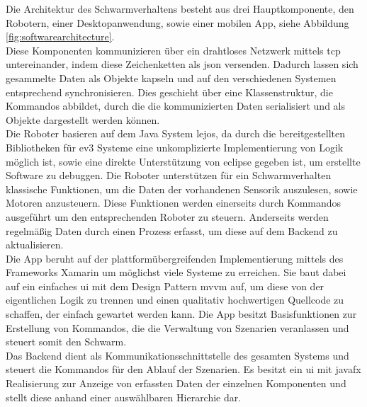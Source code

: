Die Architektur des Schwarmverhaltens besteht aus drei Hauptkomponente, den Robotern, einer Desktopanwendung, sowie einer mobilen App, siehe Abbildung \ref{fig:softwarearchitecture}.\\
Diese Komponenten kommunizieren über ein drahtloses Netzwerk mittels \gls{tcp} untereinander, indem diese Zeichenketten als \gls{json} versenden. Dadurch lassen sich gesammelte Daten als Objekte kapseln und auf den verschiedenen Systemen entsprechend synchronisieren. Dies geschieht über eine Klassenstruktur, die Kommandos abbildet, durch die die kommunizierten Daten serialisiert und als Objekte dargestellt werden können.\\
Die Roboter basieren auf dem Java System \gls{lejos}, da durch die bereitgestellten Bibliotheken für \gls{ev3} Systeme eine unkomplizierte Implementierung von Logik möglich ist, sowie eine direkte Unterstützung von \gls{eclipse} gegeben ist, um erstellte Software zu debuggen. Die Roboter unterstützen für ein Schwarmverhalten klassische Funktionen, um die Daten der vorhandenen Sensorik auszulesen, sowie Motoren anzusteuern. Diese Funktionen werden einerseits durch Kommandos ausgeführt um den entsprechenden Roboter zu steuern. Anderseits werden regelmäßig Daten durch einen Prozess erfasst, um diese auf dem Backend zu aktualisieren.\\
Die App beruht auf der plattformübergreifenden Implementierung mittels des Frameworks Xamarin um möglichst viele Systeme zu erreichen. Sie baut dabei auf ein einfaches \gls{ui} mit dem Design Pattern \gls{mvvm} auf, um diese von der eigentlichen Logik zu trennen und einen qualitativ hochwertigen Quellcode zu schaffen, der einfach gewartet werden kann. Die App besitzt Basisfunktionen zur Erstellung von Kommandos, die die Verwaltung von Szenarien veranlassen und steuert somit den Schwarm.\\
Das Backend dient als Kommunikationsschnittstelle des gesamten Systems und steuert die Kommandos für den Ablauf der Szenarien. Es besitzt ein \gls{ui} mit \gls{javafx} Realisierung zur Anzeige von erfassten Daten der einzelnen Komponenten und stellt diese anhand einer auswählbaren Hierarchie dar.

